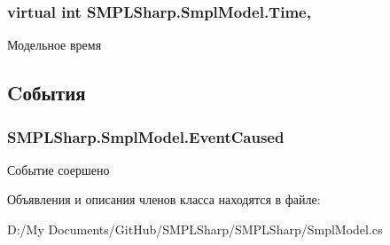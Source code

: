 \hypertarget{class_s_m_p_l_sharp_1_1_smpl_model_a091e0759cad46e82a02ff253a232a37d}{
\subsubsection[{Time}]{\setlength{\rightskip}{0pt plus 5cm}virtual int S\-M\-P\-L\-Sharp.\-Smpl\-Model.\-Time\hspace{0.3cm}{\ttfamily [get]}, {\ttfamily [set]}}}\label{df/d34/class_s_m_p_l_sharp_1_1_smpl_model_a091e0759cad46e82a02ff253a232a37d}


Модельное время 



\subsection{Cобытия}
\hypertarget{class_s_m_p_l_sharp_1_1_smpl_model_abfa9344a73f4845e02be97fd5b963ed3}{
\subsubsection[{Event\-Caused}]{ S\-M\-P\-L\-Sharp.\-Smpl\-Model.\-Event\-Caused}}\label{df/d34/class_s_m_p_l_sharp_1_1_smpl_model_abfa9344a73f4845e02be97fd5b963ed3}


Событие соершено 



Объявления и описания членов класса находятся в файле\-:\begin{DoxyCompactItemize}
\item 
D\-:/\-My Documents/\-Git\-Hub/\-S\-M\-P\-L\-Sharp/\-S\-M\-P\-L\-Sharp/Smpl\-Model.\-cs\end{DoxyCompactItemize}
